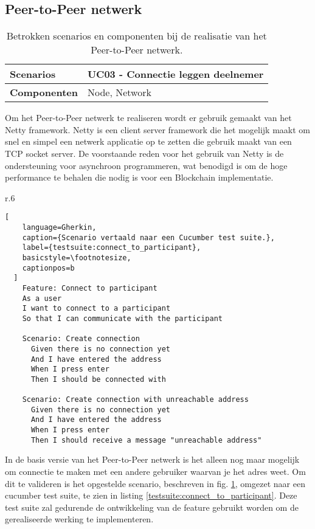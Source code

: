 \subsection{Peer-to-Peer netwerk}

\begin{table}[ht]
  \begin{tabular}{|p{}|p{}|}
    \hline
    \textbf{Scenarios} & UC03 - Connectie leggen deelnemer \\
    \hline
    \textbf{Componenten} & Node, Network \\
    \hline
  \end{tabular}
  \caption[Betrokken architectuur onderdelen implementatie Peer-to-Peer netwerk]{Betrokken scenarios en componenten bij de realisatie van het Peer-to-Peer netwerk.}
  \label{realisatie:p2p}
\end{table}

Om het Peer-to-Peer netwerk te realiseren wordt er gebruik gemaakt van het Netty framework. Netty is een client server framework die het mogelijk maakt om snel en simpel een netwerk applicatie op te zetten die gebruik maakt van een \acrshort{TCP} socket server. De voorstaande reden voor het gebruik van Netty is de ondersteuning voor asynchroon programmeren, wat benodigd is om de hoge performance te behalen die nodig is voor een Blockchain implementatie.

\begin{wrapfigure}{r}{.6\textwidth}
  \begin{lstlisting}[
    language=Gherkin,
    caption={Scenario vertaald naar een Cucumber test suite.},
    label={testsuite:connect_to_participant},
    basicstyle=\footnotesize,
    captionpos=b
  ]
    Feature: Connect to participant
    As a user
    I want to connect to a participant
    So that I can communicate with the participant

    Scenario: Create connection
      Given there is no connection yet
      And I have entered the address
      When I press enter
      Then I should be connected with 

    Scenario: Create connection with unreachable address
      Given there is no connection yet
      And I have entered the address
      When I press enter
      Then I should receive a message "unreachable address"
  \end{lstlisting}
\end{wrapfigure}

In de basis versie van het Peer-to-Peer netwerk is het alleen nog maar mogelijk om connectie te maken met een andere gebruiker waarvan je het adres weet. Om dit te valideren is het opgestelde scenario, beschreven in fig. \ref{realisatie:p2p}, omgezet naar een cucumber test suite, te zien in listing \ref{testsuite:connect_to_participant}. Deze test suite zal gedurende de ontwikkeling van de feature gebruikt worden om de gerealiseerde werking te implementeren.

